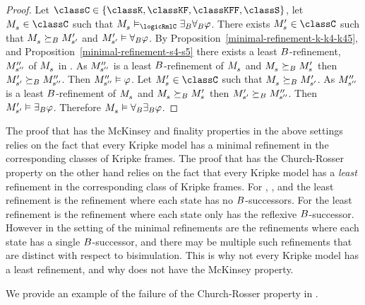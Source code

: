 \begin{proof}
Let $\classC \in \{\classK, \classKF, \classKFF, \classS\}$, let $\kPModel{\kStateS} \in \classC$ such that $\kPModel{\kStateS} \entails_\logicRmlC \somerefsBs \allrefsBs \phi$.
There exists $\kPModelP{\kStateS} \in \classC$ such that $\kPModel{\kStateS} \simulatesBs \kPModelP{\kStateSP}$ and ${M^{\prime}_{{s}^{\prime}}} \vDash {\forall_{B}} \varphi$.
By Proposition~\ref{minimal-refinement-k-k4-k45}, and Proposition~\ref{minimal-refinement-s4-s5} there exists a least $B$-refinement, ${M^{\prime\prime}_{{s}^{\prime\prime}}}$ of $\kPModel{\kStateS}$ in \classS{}.
As ${M^{\prime\prime}_{{s}^{\prime\prime}}}$ is a least $B$-refinement of $\kPModel{\kStateS}$ and $\kPModel{\kStateS} \simulatesBs \kPModelP{\kStateS}$ then ${M^{\prime}_{{s}^{\prime}}} \succeq_{B} {M^{\prime\prime}_{{s}^{\prime\prime}}}$.
Then ${M^{\prime\prime}_{{s}^{\prime\prime}}} \vDash \varphi$.
Let $\kPModelP{\kStateS} \in \classC$ such that $\kPModel{\kStateS} \simulatesBs \kPModelP{\kStateSP}$.
As ${M^{\prime\prime}_{{s}^{\prime\prime}}}$ is a least $B$-refinement of $\kPModel{\kStateS}$ and $\kPModel{\kStateS} \simulatesBs \kPModelP{\kStateS}$ then ${M^{\prime}_{{s}^{\prime}}} \succeq_{B} {M^{\prime\prime}_{{s}^{\prime\prime}}}$.
Then ${M^{\prime}_{{s}^{\prime}}} \vDash {\exists_{B}} \varphi$.
Therefore $\kPModel{\kStateS} \entails \allrefsBs \somerefsBs \phi$.
\end{proof}

The proof that \logicRml{} has the McKinsey and finality properties in the above settings relies on the fact that every Kripke model has a minimal refinement in the corresponding classes of Kripke frames.
The proof that \logicRml{} has the Church-Rosser property on the other hand relies on the fact that every Kripke model has a {\em least} refinement in the corresponding class of Kripke frames.
For \classK{}, \classKF{}, and \classKFF{} the least refinement is the refinement where each state has no $B$-successors.
For \classS{} the least refinement is the refinement where each state only has the reflexive $B$-successor.
However in the setting of \classKD{} the minimal refinements are the refinements where each state has a single $B$-successor, and there may be multiple such refinements that are distinct with respect to bisimulation.
This is why not every \classKD{} Kripke model has a least refinement, and why \logicRmlKD{} does not have the McKinsey property.

We provide an example of the failure of the Church-Rosser property in \logicRmlKD{}.

